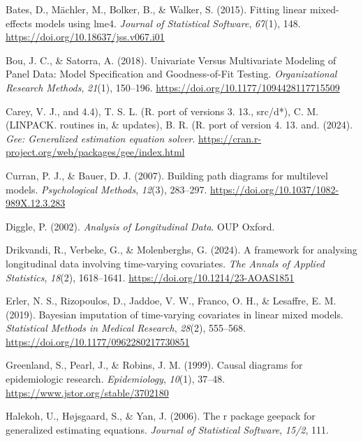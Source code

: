 \documentclass[
  12pt,
  a4paper,
]{article}
\newlength{\cslhangindent}
\newlength{\cslentryspacingunit} %
\newenvironment{CSLReferences}[2] %
 {%
  \setlength{\parindent}{0pt}
  \ifodd #1
  \let\oldpar\par
  \def\par{\hangindent=\cslhangindent\oldpar}
  \fi
  \setlength{\parskip}{#2\cslentryspacingunit}
 }%
 {}
\begin{document}
\hypertarget{refs}{}
\begin{CSLReferences}{1}{0}
\leavevmode{}%
Bates, D., Mächler, M., Bolker, B., \& Walker, S. (2015). Fitting linear
mixed-effects models using {lme4}. \emph{Journal of Statistical
Software}, \emph{67}(1), 148.
\url{https://doi.org/10.18637/jss.v067.i01}

\leavevmode{}%
Bou, J. C., \& Satorra, A. (2018). Univariate Versus Multivariate
Modeling of Panel Data: Model Specification and Goodness-of-Fit Testing.
\emph{Organizational Research Methods}, \emph{21}(1), 150--196.
\url{https://doi.org/10.1177/1094428117715509}

\leavevmode{}%
Carey, V. J., and 4.4), T. S. L. (R. port of versions 3. 13., src/d*),
C. M. (LINPACK. routines in, \& updates), B. R. (R. port of version 4.
13. and. (2024). \emph{Gee: Generalized estimation equation solver}.
\url{https://cran.r-project.org/web/packages/gee/index.html}

\leavevmode{}%
Curran, P. J., \& Bauer, D. J. (2007). Building path diagrams for
multilevel models. \emph{Psychological Methods}, \emph{12}(3), 283--297.
\url{https://doi.org/10.1037/1082-989X.12.3.283}

\leavevmode{}%
Diggle, P. (2002). \emph{Analysis of Longitudinal Data}. OUP Oxford.

\leavevmode{}%
Drikvandi, R., Verbeke, G., \& Molenberghs, G. (2024). A framework for
analysing longitudinal data involving time-varying covariates. \emph{The
Annals of Applied Statistics}, \emph{18}(2), 1618--1641.
\url{https://doi.org/10.1214/23-AOAS1851}

\leavevmode{}%
Erler, N. S., Rizopoulos, D., Jaddoe, V. W., Franco, O. H., \& Lesaffre,
E. M. (2019). Bayesian imputation of time-varying covariates in linear
mixed models. \emph{Statistical Methods in Medical Research},
\emph{28}(2), 555--568. \url{https://doi.org/10.1177/0962280217730851}

\leavevmode{}%
Greenland, S., Pearl, J., \& Robins, J. M. (1999). Causal diagrams for
epidemiologic research. \emph{Epidemiology}, \emph{10}(1), 37--48.
\url{https://www.jstor.org/stable/3702180}

\leavevmode{}%
Halekoh, U., Højsgaard, S., \& Yan, J. (2006). The r package geepack for
generalized estimating equations. \emph{Journal of Statistical
Software}, \emph{15/2}, 111.


\end{CSLReferences}
\end{document}
